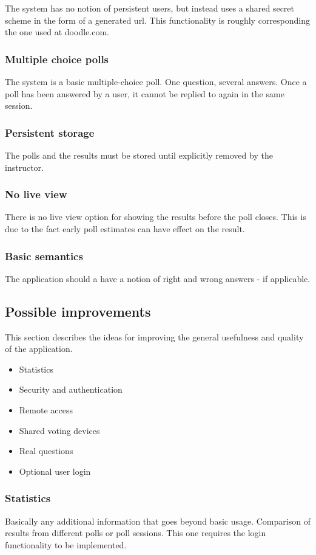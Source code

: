 \documentclass{acm_proc_article-sp}
\begin{document}
The system has no notion of persistent users, but instead uses a shared secret scheme in the form of a generated url. This functionality is roughly corresponding the one used at doodle.com.

\subsubsection*{Multiple choice polls}
The system is a basic multiple-choice poll. One question, several answers. Once a poll has been answered by a user, it cannot be replied to again in the same session.

\subsubsection*{Persistent storage}
The polls and the results must be stored until explicitly removed by the instructor.

\subsubsection*{No live view}
There is no live view option for showing the results before the poll closes. This is due to the fact early poll estimates can have effect on the result.

\subsubsection*{Basic semantics}
The application should a have a notion of right and wrong answers - if applicable.

\subsection{Possible improvements}
This section describes the ideas for improving the general usefulness and quality of the application.
\begin{itemize}
  \item Statistics
  \item Security and authentication
  \item Remote access 
  \item Shared voting devices 
  \item Real questions
  \item Optional user login
\end{itemize}

\subsubsection*{Statistics}
Basically any additional information that goes beyond basic usage. Comparison of results from different polls or poll sessions. This one requires the login functionality to be implemented.
\end{document}
